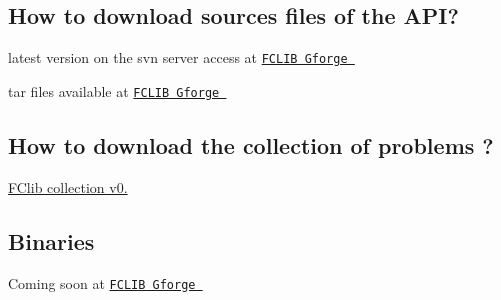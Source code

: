 \hypertarget{download_howtosources}{}\subsection{How to download sources files of the A\+P\+I?}\label{download_howtosources}

\begin{DoxyItemize}
\item latest version on the svn server access at \href{ https://gforge.inria.fr/scm/?group_id=2824}{\tt F\+C\+L\+I\+B Gforge } 
\item tar files available at \href{https://gforge.inria.fr/frs/?group_id=2824}{\tt F\+C\+L\+I\+B Gforge } 
\end{DoxyItemize}\hypertarget{download_howtolibrary}{}\subsection{How to download the collection of problems ?}\label{download_howtolibrary}

\begin{DoxyItemize}
\item \hyperlink{problems_0_2}{F\+Clib collection v0.}  
\end{DoxyItemize}\hypertarget{download_howto}{}\subsection{Binaries}\label{download_howto}

\begin{DoxyItemize}
\item Coming soon at \href{https://gforge.inria.fr/frs/?group_id=2824}{\tt F\+C\+L\+I\+B Gforge } 
\end{DoxyItemize}

~\newline
 ~\newline
 